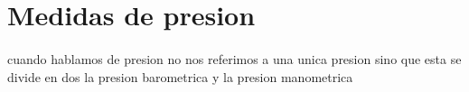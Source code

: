 \documentclass{article}
\begin{document}
\section*{Medidas de presion}
\paragraph*{}
cuando hablamos de presion no nos referimos a una unica presion sino que esta se divide en dos 
la presion barometrica y la presion manometrica 
\end{document}
